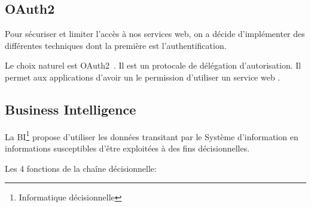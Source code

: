 \subsection{OAuth2}

Pour sécuriser et limiter l'accès à nos services web, on a décide d'implémenter des différentes techniques dont la première est l'authentification.

Le choix naturel est OAuth2~\cite{RFC6749}. Il est un protocale de délégation
d'autorisation. Il permet aux applications  d'avoir un
le permission d'utiliser un service web .



\subsection{Business Intelligence}

La \acrfull{BI}\footnote{Informatique décisionnelle} propose d'utiliser les
données transitant par le Système d'information en informations susceptibles
d'être exploitées à des fins décisionnelles.


Les 4 fonctions de la chaîne décisionnelle:


